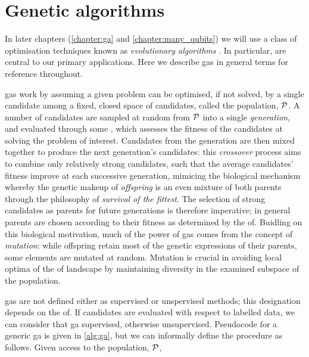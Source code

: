 \section{Genetic algorithms}\label{sec:genetic_algorithms}
In later chapters (\cref{chapter:ga} and \cref{chapter:many_qubits}) 
    we will use a class of optimisation techniques known as
    \emph{evolutionary algorithms} \cite{back1996evolutionary, de2020evolutionary}.
In particular, \emph{} are central to our primary applications.
Here we describe \glspl{ga} in general terms for reference throughout. 
\par 
\glspl{ga} work by assuming a given problem can be optimised, if not solved, by a single candidate 
    among a fixed, closed space of candidates, called the population, $\mathcal{P}$. 
A number of candidates are sampled at random from $\mathcal{P}$ into a single \emph{generation}, 
    and evaluated through some , which assesses the fitness of the candidates at solving the problem of interest. 
Candidates from the generation are then mixed together to produce the next generation's candidates: 
    this \emph{crossover} process aims to combine only relatively strong candidates, such that the average 
    candidates' fitness improve at each successive generation, 
    mimicing the biological mechanism whereby the genetic makeup of \emph{offspring} is an even mixture of both parents
    through the philosophy of \emph{survival of the fittest}. 
The selection of strong candidates as parents for future generations is therefore imperative; 
    in general parents are chosen according to their fitness as determined by the \gls{of}. 
Buidling on this biological motivation, much of the power of \glspl{ga} comes from the concept of \emph{mutation}: 
    while offspring retain most of the genetic expressions of their parents, some elements are mutated at random.
Mutation is crucial in avoiding local optima of the \gls{of} landscape
    by maintaining diversity in the examined subspace of the population.
\par 

\glspl{ga} are not defined either as supervised or unspervised methods;
    this designation depends on the \gls{of}. 
If candidates are evaluated with respect to labelled data, we can consider that \gls{ga} supervised, 
    otherwise unsupervised. 
Pseudocode for a generic \gls{ga} is given in \cref{alg:ga},
    but we can informally define the procedure as follows. 
Given access to the population, $\mathcal{P}$, 

